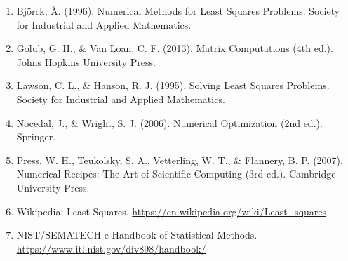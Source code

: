 \documentclass[12pt]{article}
\begin{document}
\begin{enumerate}
    \item Björck, Å. (1996). Numerical Methods for Least Squares Problems. Society for Industrial and Applied Mathematics.
    \item Golub, G. H., \& Van Loan, C. F. (2013). Matrix Computations (4th ed.). Johns Hopkins University Press.
    \item Lawson, C. L., \& Hanson, R. J. (1995). Solving Least Squares Problems. Society for Industrial and Applied Mathematics.
    \item Nocedal, J., \& Wright, S. J. (2006). Numerical Optimization (2nd ed.). Springer.
    \item Press, W. H., Teukolsky, S. A., Vetterling, W. T., \& Flannery, B. P. (2007). Numerical Recipes: The Art of Scientific Computing (3rd ed.). Cambridge University Press.
    \item Wikipedia: Least Squares. \url{https://en.wikipedia.org/wiki/Least_squares}
    \item NIST/SEMATECH e-Handbook of Statistical Methods. \url{https://www.itl.nist.gov/div898/handbook/}
\end{enumerate}
\end{document}
